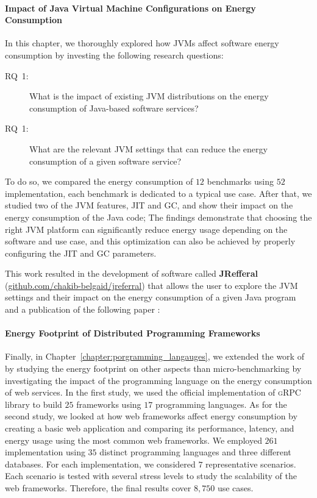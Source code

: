 \paragraph*{Impact of Java Virtual Machine Configurations on Energy Consumption}

In this chapter, we thoroughly explored how JVMs affect software energy consumption by investing the following research questions:
\begin{description}
      \item[\textsc{RQ}~1:] What is the impact of existing JVM distributions on the energy consumption of Java-based software services?
      \item [\textsc{RQ}~1:] What are the relevant JVM settings that can reduce the energy consumption of a given software service?
\end{description}
To do so, we compared the energy consumption of $12$ benchmarks using $52$ implementation, each benchmark is dedicated to a typical use case.
After that, we studied two of the JVM features, JIT and GC, and show their impact on the energy consumption of the Java code;
The findings demonstrate that choosing the right JVM platform can significantly reduce energy usage depending on the software and use case, and this optimization can also be achieved by properly configuring the JIT and GC parameters.

This work resulted in the development of software called \textbf{JRefferal} (\url{github.com/chakib-belgaid/jreferral}) that allows the user to explore the JVM settings and their impact on the energy consumption of a given Java program and a publication of the following paper : 
\\

\paragraph*{Energy Footprint of Distributed Programming Frameworks}
Finally, in Chapter~\ref{chapter:porgramming_langauges}, we extended the work of \citeauthor{pereira_energy_2017}~\cite{pereira_energy_2017} by studying the energy footprint on other aspects than micro-benchmarking by investigating the impact of the programming language on the energy consumption of web services. 
In the first study, we used the official implementation of \textsc{gRPC} library to build $25$ frameworks using $17$ programming languages. 
As for the second study, we looked at how web frameworks affect energy consumption by creating a basic web application and comparing its performance, latency, and energy usage using the most common web frameworks.
We employed $261$ implementation using $35$ distinct programming languages and three different databases.
For each implementation, we considered $7$ representative scenarios.
Each scenario is tested with several stress levels to study the scalability of the web frameworks.
Therefore, the final results cover $8,750$ use cases.

